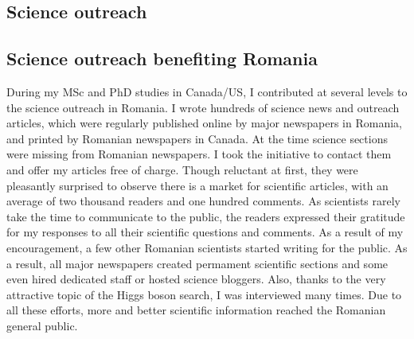 \documentclass[12pt]{article} %
\begin{document}
\begin{appendices}
\section{Science outreach} \label{appendix:ScienceOutreach} %

\subsection{Science outreach benefiting Romania}

During my MSc and PhD studies in Canada/US, I contributed at several levels to the science outreach in Romania. I wrote hundreds of science news and outreach articles, which were regularly published online by major newspapers in Romania, and printed by Romanian newspapers in Canada. At the time science sections were missing from Romanian newspapers. I took the initiative to contact them and offer my articles free of charge. Though reluctant at first, they were pleasantly surprised to observe there is a market for scientific articles, with an average of two thousand readers and one hundred comments. As scientists rarely take the time to communicate to the public, the readers expressed their gratitude for my responses to all their scientific questions and comments. As a result of my encouragement, a few other Romanian scientists started writing for the public. As a result, all major newspapers created permament scientific sections and some even hired dedicated staff or hosted science bloggers. Also, thanks to the very attractive topic of the Higgs boson search, I was interviewed many times. Due to all these efforts, more and better scientific information reached the Romanian general public.  


\end{appendices}
\end{document}
